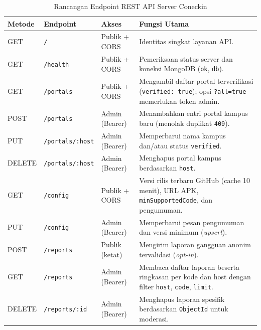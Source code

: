 \begin{table}[H]
\centering
\caption{Rancangan Endpoint REST API Server Coneckin}
\label{tab:endpoints}
\small
\begin{tabular}{@{}p{1.5cm}p{2.9cm}p{2.2cm}p{6.0cm}@{}}
\toprule
\textbf{Metode} & \textbf{Endpoint} & \textbf{Akses} & \textbf{Fungsi Utama} \\
\midrule
GET & \texttt{/} & Publik + CORS & Identitas singkat layanan API. \\
GET & \texttt{/health} & Publik + CORS & Pemeriksaan status server dan koneksi MongoDB (\texttt{ok}, \texttt{db}). \\
GET & \texttt{/portals} & Publik + CORS & Mengambil daftar portal terverifikasi (\texttt{verified: true}); opsi \texttt{?all=true} memerlukan token admin. \\
POST & \texttt{/portals} & Admin (Bearer) & Menambahkan entri portal kampus baru (menolak duplikat \texttt{409}). \\
PUT & \texttt{/portals/:host} & Admin (Bearer) & Memperbarui nama kampus dan/atau status \texttt{verified}. \\
DELETE & \texttt{/portals/:host} & Admin (Bearer) & Menghapus portal kampus berdasarkan \texttt{host}. \\
GET & \texttt{/config} & Publik + CORS & Versi rilis terbaru GitHub (cache 10 menit), URL APK, \texttt{minSupportedCode}, dan pengumuman. \\
PUT & \texttt{/config} & Admin (Bearer) & Memperbarui pesan pengumuman dan versi minimum (\textit{upsert}). \\
POST & \texttt{/reports} & Publik (ketat) & Mengirim laporan gangguan anonim tervalidasi (\textit{opt-in}). \\
GET & \texttt{/reports} & Admin (Bearer) & Membaca daftar laporan beserta ringkasan per kode dan host dengan filter \texttt{host}, \texttt{code}, \texttt{limit}. \\
DELETE & \texttt{/reports/:id} & Admin (Bearer) & Menghapus laporan spesifik berdasarkan \texttt{ObjectId} untuk moderasi. \\
\bottomrule
\end{tabular}
\end{table}

